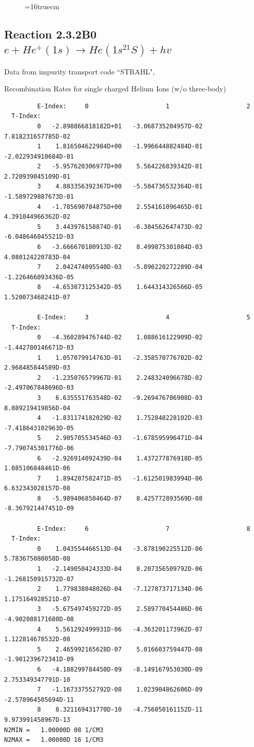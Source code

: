\documentclass[12pt,dvipdfmx]{article}
\begin{document}
\begin{figure} \label{2.8A0}
\epsfxsize=16truecm 
\end{figure}
\newpage

\subsection{
Reaction 2.3.2B0  $e + He^+(1s) \rightarrow He(1s^21S) + hv$
}
Data from impurity transport code ``STRAHL", \cite{kn:Behringer}

  Recombination Rates for single charged Helium Ions (w/o three-body)


\begin{small}\begin{verbatim}
         E-Index:     0                     1                     2
  T-Index:
         0   -2.898866818182D+01   -3.068735204957D-02    7.818231657785D-02
         1    1.816504622984D+00   -1.996644882484D-01   -2.022934910684D-01
         2   -5.957620306977D+00    5.564226839342D-01    2.720939045109D-01
         3    4.883356392367D+00   -5.504736532364D-01   -1.589729887673D-01
         4   -1.785690784875D+00    2.554161096465D-01    4.391044966362D-02
         5    3.443976158874D-01   -6.304562647473D-02   -6.048646045521D-03
         6   -3.666670180913D-02    8.499875301084D-03    4.080124220783D-04
         7    2.042474095540D-03   -5.896220272289D-04   -1.226466093436D-05
         8   -4.653873125342D-05    1.644314326566D-05    1.520073468241D-07

         E-Index:     3                     4                     5
  T-Index:
         0   -4.360289476744D-02    1.088616122909D-02   -1.442780146671D-03
         1    1.057079914763D-01   -2.358570776702D-02    2.968485844589D-03
         2   -1.235076579967D-01    2.248324096678D-02   -2.497067848696D-03
         3    6.635551763548D-02   -9.269476706908D-03    8.089219419856D-04
         4   -1.831174182029D-02    1.752848228102D-03   -7.418643102963D-05
         5    2.905705534546D-03   -1.678595996471D-04   -7.790745301776D-06
         6   -2.926914092439D-04    1.437277876918D-05    1.085106848461D-06
         7    1.894207582471D-05   -1.612501983994D-06    6.632343028157D-08
         8   -5.989406850464D-07    8.425772893569D-08   -8.367921447451D-09

         E-Index:     6                     7                     8
  T-Index:
         0    1.043554466513D-04   -3.878190225512D-06    5.783675088058D-08
         1   -2.149050424333D-04    8.207356509792D-06   -1.268150915732D-07
         2    1.779838048026D-04   -7.127873717134D-06    1.175164928521D-07
         3   -5.675497459272D-05    2.589770454486D-06   -4.902088171680D-08
         4    5.561292499931D-06   -4.363201173962D-07    1.122814678532D-08
         5    2.465992165628D-07    5.016603759447D-08   -1.901239672341D-09
         6   -4.188299784450D-09   -8.149167953030D-09    2.753349347791D-10
         7   -1.167337552792D-08    1.023904862606D-09   -2.578964505694D-11
         8    8.321169431770D-10   -4.756050161152D-11    9.973991458967D-13
N2MIN =   1.00000D 08 1/CM3
N2MAX =   1.00000D 16 1/CM3


\end{verbatim}
\end{small}
\end{document}
